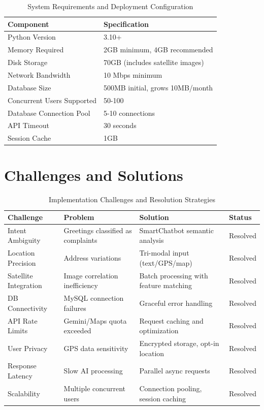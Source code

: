\documentclass[11pt,a4paper]{article}
\begin{document}
\begin{table}[H]
\centering
\caption{System Requirements and Deployment Configuration}
\label{tab:deployment}
\begin{tabular}{|l|l|}
\hline
\textbf{Component} & \textbf{Specification} \\
\hline
Python Version & 3.10+ \\
Memory Required & 2GB minimum, 4GB recommended \\
Disk Storage & 70GB (includes satellite images) \\
Network Bandwidth & 10 Mbps minimum \\
Database Size & 500MB initial, grows 10MB/month \\
Concurrent Users Supported & 50-100 \\
Database Connection Pool & 5-10 connections \\
API Timeout & 30 seconds \\
Session Cache & 1GB \\
\hline
\end{tabular}
\end{table}

\section{Challenges and Solutions}

\begin{table}[H]
\centering
\caption{Implementation Challenges and Resolution Strategies}
\label{tab:challenges}
\begin{tabular}{|p{2cm}|p{3cm}|p{4cm}|l|}
\hline
\textbf{Challenge} & \textbf{Problem} & \textbf{Solution} & \textbf{Status} \\
\hline
Intent Ambiguity & Greetings classified as complaints & SmartChatbot semantic analysis & Resolved \\
Location Precision & Address variations & Tri-modal input (text/GPS/map) & Resolved \\
Satellite Integration & Image correlation inefficiency & Batch processing with feature matching & Resolved \\
DB Connectivity & MySQL connection failures & Graceful error handling & Resolved \\
API Rate Limits & Gemini/Maps quota exceeded & Request caching and optimization & Resolved \\
User Privacy & GPS data sensitivity & Encrypted storage, opt-in location & Resolved \\
Response Latency & Slow AI processing & Parallel async requests & Resolved \\
Scalability & Multiple concurrent users & Connection pooling, session caching & Resolved \\
\hline
\end{tabular}
\end{table}
\end{document}
